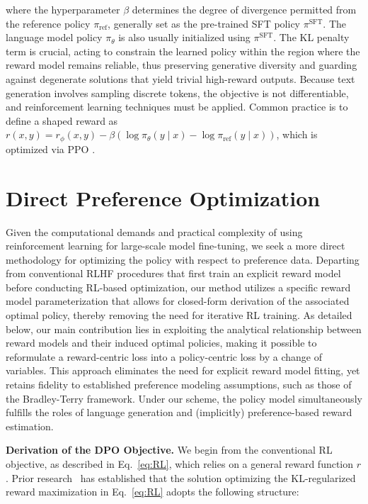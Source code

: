 where the hyperparameter $\beta$ determines the degree of divergence permitted from the reference policy $\pi_\text{ref}$, generally set as the pre-trained SFT policy $\pi^\text{SFT}$. The language model policy $\pi_\theta$ is also usually initialized using $\pi^\text{SFT}$. The KL penalty term is crucial, acting to constrain the learned policy within the region where the reward model remains reliable, thus preserving generative diversity and guarding against degenerate solutions that yield trivial high-reward outputs. Because text generation involves sampling discrete tokens, the objective is not differentiable, and reinforcement learning techniques must be applied. Common practice \citep{ziegler2020finetuning, stiennon2022learning, bai2022training, ouyang2022training} is to define a shaped reward as ${r(x, y) = r_{\phi}(x, y) -\beta (\log \pi_{\theta}(y\mid x) - \log \pi_\text{ref}(y\mid x))}$, which is optimized via PPO \cite{schulman2017proximal}.

\section{Direct Preference Optimization}\label{sec:DPO}

Given the computational demands and practical complexity of using reinforcement learning for large-scale model fine-tuning, we seek a more direct methodology for optimizing the policy with respect to preference data. Departing from conventional RLHF procedures that first train an explicit reward model before conducting RL-based optimization, our method utilizes a specific reward model parameterization that allows for closed-form derivation of the associated optimal policy, thereby removing the need for iterative RL training. As detailed below, our main contribution lies in exploiting the analytical relationship between reward models and their induced optimal policies, making it possible to reformulate a reward-centric loss into a policy-centric loss by a change of variables. This approach eliminates the need for explicit reward model fitting, yet retains fidelity to established preference modeling assumptions, such as those of the Bradley-Terry framework. Under our scheme, the policy model simultaneously fulfills the roles of language generation and (implicitly) preference-based reward estimation.

\textbf{Derivation of the DPO Objective.} We begin from the conventional RL objective, as described in Eq.~\ref{eq:RL}, which relies on a general reward function $r$. Prior research~\citep{peters2007reinforcement, peng2019advantage, korbak2022reinforcement, go2023aligning} has established that the solution optimizing the KL-regularized reward maximization in Eq.~\ref{eq:RL} adopts the following structure:

